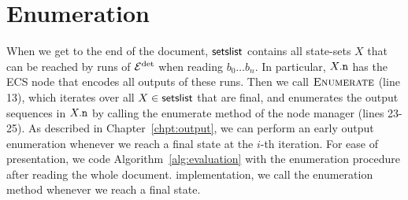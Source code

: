 \section{Enumeration}
When we get to the end of the document, $\textsf{setslist}$ contains all state-sets
$X$ that can be reached by runs of $\mathcal{E}^{\operatorname{det}}$ when reading $b_0 \ldots b_n$. In
particular, $X.\mathtt{n}$ has the ECS node that encodes all outputs of these runs.
Then we call $\textproc{Enumerate}$ (line 13), which iterates over all $X \in
\textsf{setslist}$ that are final, and enumerates the output sequences in $X.\mathtt{n}$
by calling the enumerate method of the node manager (lines 23-25).
%
As described in Chapter~\ref{chpt:output}, we can perform an early output
enumeration whenever we reach a final state at the $i$-th iteration. For ease of
presentation, we code Algorithm~\ref{alg:evaluation} with the enumeration
procedure after reading the whole document. %
implementation, we call the enumeration method whenever we reach a final state.

